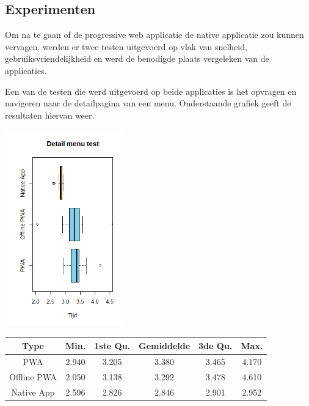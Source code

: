 \documentclass[a0,portrait]{a0poster}
\begin{document}
\begin{multicols}{2}
\color{Black} %
\color{HoGentAccent1} 
\section*{Experimenten}
\color{black}
Om na te gaan of de progressive web applicatie de native applicatie zou kunnen vervagen, werden er twee testen uitgevoerd op vlak van snelheid, gebruiksvriendelijkheid en werd de benodigde plaats vergeleken van de applicaties.

Een van de testen die werd uitgevoerd op beide applicaties is het opvragen en navigeren naar de detailpagina van een menu. Onderstaande grafiek geeft de resultaten hiervan weer.

\begin{center}
	\includegraphics[width=200px]{Rplot_DetailMenu_AllType}
\end{center}

\begin{center}
		\centering
	\begin{tabular}{|c|c|c|c|c|c|}
		\hline
		Type        & Min.  & 1ste Qu. & Gemiddelde & 3de Qu. & Max.  \\
		\hline
		PWA         & 2.940 & 3.205    & 3.380      & 3.465   & 4.170 \\
		\hline
		Offline PWA & 2.050 & 3.138    & 3.292      & 3.478   & 4.610 \\
		\hline
		Native App  & 2.596 & 2.826    & 2.846      & 2.901   & 2.952 \\
		\hline
	\end{tabular}
\end{center}


\end{multicols}
\end{document}
